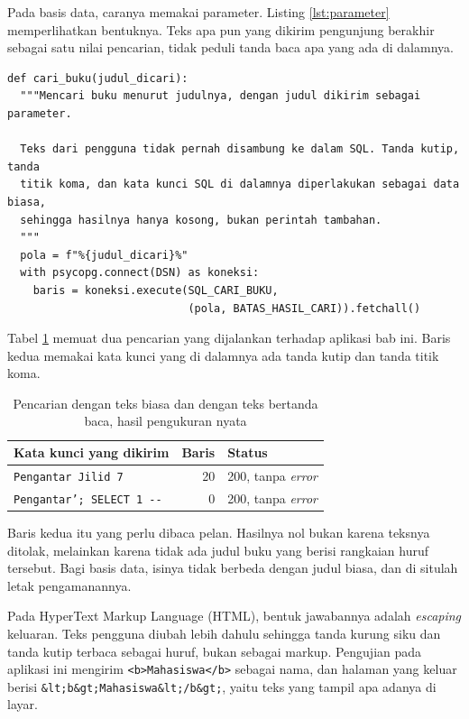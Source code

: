 Pada basis data, caranya memakai parameter. Listing \ref{lst:parameter}
memperlihatkan bentuknya. Teks apa pun yang dikirim pengunjung berakhir
sebagai satu nilai pencarian, tidak peduli tanda baca apa yang ada di
dalamnya.

\begin{lstlisting}[style=PythonStyle, caption={Teks pengguna dikirim sebagai parameter, bukan disambung ke SQL, tersedia di \berkas{sources/chapter07/aplikasi.py}}, label={lst:parameter}]
def cari_buku(judul_dicari):
  """Mencari buku menurut judulnya, dengan judul dikirim sebagai parameter.

  Teks dari pengguna tidak pernah disambung ke dalam SQL. Tanda kutip, tanda
  titik koma, dan kata kunci SQL di dalamnya diperlakukan sebagai data biasa,
  sehingga hasilnya hanya kosong, bukan perintah tambahan.
  """
  pola = f"%{judul_dicari}%"
  with psycopg.connect(DSN) as koneksi:
    baris = koneksi.execute(SQL_CARI_BUKU,
                            (pola, BATAS_HASIL_CARI)).fetchall()
\end{lstlisting}

Tabel \ref{tab:parameter} memuat dua pencarian yang dijalankan terhadap
aplikasi bab ini. Baris kedua memakai kata kunci yang di dalamnya ada tanda
kutip dan tanda titik koma.

\begin{table}[!htb]
  \centering
  \caption{Pencarian dengan teks biasa dan dengan teks bertanda baca, hasil
           pengukuran nyata}
  \label{tab:parameter}
  \begin{tabularx}{\textwidth}{Xrl}
    \hline
    \textbf{Kata kunci yang dikirim} & \textbf{Baris} & \textbf{Status} \\
    \hline
    \texttt{Pengantar Jilid 7} & 20 & 200, tanpa \textit{error} \\
    \hline
    \texttt{Pengantar'; SELECT 1 -{}-} & 0 & 200, tanpa \textit{error} \\
    \hline
  \end{tabularx}
\end{table}

Baris kedua itu yang perlu dibaca pelan. Hasilnya nol bukan karena teksnya
ditolak, melainkan karena tidak ada judul buku yang berisi rangkaian huruf
tersebut. Bagi basis data, isinya tidak berbeda dengan judul biasa, dan di
situlah letak pengamanannya.

Pada HyperText Markup Language (HTML), bentuk jawabannya adalah \textit{escaping} keluaran. Teks pengguna
diubah lebih dahulu sehingga tanda kurung siku dan tanda kutip terbaca
sebagai huruf, bukan sebagai markup. Pengujian pada aplikasi ini mengirim
\texttt{<b>Mahasiswa</b>} sebagai nama, dan halaman yang keluar berisi
\texttt{\&lt;b\&gt;Mahasiswa\&lt;/b\&gt;}, yaitu teks yang tampil apa adanya
di layar.


